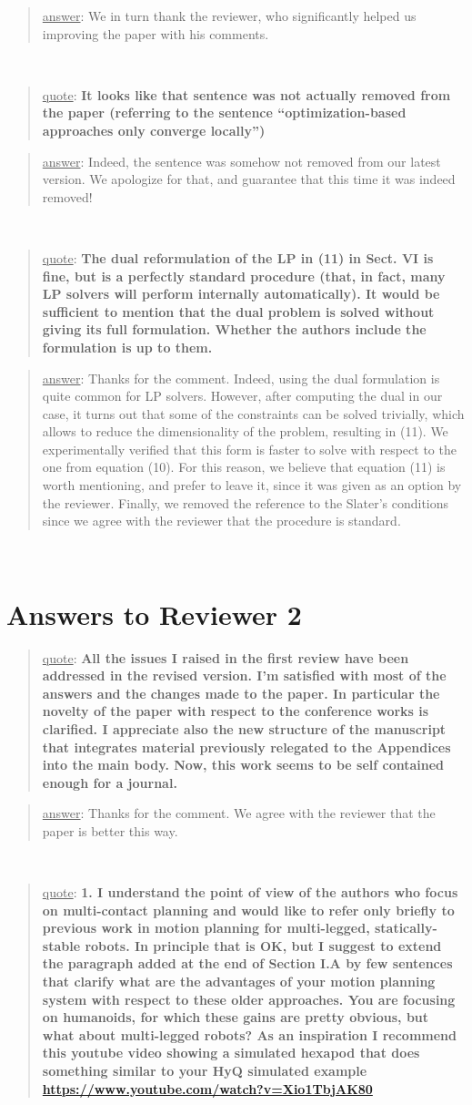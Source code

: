 \documentclass[a4paper]{article}
\newcommand\quot[1]{\begin{quote} \underline{quote}: \textbf{#1}\end{quote}}
\newcommand\as[1]{\begin{quote} \underline{answer}: {#1}\end{quote} }
\begin{document}
\as{We in turn thank the reviewer, who significantly helped us improving the paper with his comments.}

\leavevmode \\
\quot {It looks like that sentence was not actually removed from the
paper (referring to the sentence ``optimization-based approaches
only converge locally'')
}

\as{Indeed, the sentence was somehow not removed from our latest version. We apologize for that, and guarantee that this time it was indeed removed!}

\leavevmode \\
\quot {
The dual reformulation of the LP in (11) in Sect. VI is fine, but is
a perfectly standard procedure (that, in fact, many LP solvers will
perform internally automatically). It would be sufficient to mention
that the dual problem is solved without giving its full formulation.
Whether the authors include the formulation is up to them.}

\as{Thanks for the comment. Indeed, using the dual formulation is quite common for LP solvers. However, after computing the dual in our case, it turns out that some of the constraints can be solved trivially, which allows to reduce the dimensionality of the problem, resulting in (11). We experimentally verified that this form is faster to solve with respect to the one from equation (10). For this reason, we believe that equation (11) is worth mentioning, and prefer to leave it, since it was given as an option by the reviewer. Finally, we removed the reference to the Slater's conditions since we agree with the reviewer that the procedure is standard.}

\leavevmode \\
\section{Answers to Reviewer 2}
\quot{All the issues I raised in the first review have been addressed in
the revised version. I'm satisfied with most of the answers and the
changes made to the paper. In particular the novelty of the paper with
respect to the conference works is clarified. I appreciate also the new
structure of the manuscript that integrates material previously
relegated to the Appendices into the main body. Now, this work seems to
be self contained enough for a journal. }
\as{Thanks for the comment. We agree with the reviewer that the paper is better this way.}

\leavevmode \\
\quot{
1. I understand the point of view of the authors who focus on
multi-contact planning and would like to refer only briefly to previous
work in motion planning for multi-legged, statically-stable robots. In
principle that is OK, but I suggest to extend the paragraph added at
the end of Section I.A by few sentences that clarify what are the
advantages of your motion planning system with respect to these older
approaches. You are focusing on humanoids, for which these gains are
pretty obvious, but what about multi-legged robots? As an inspiration I
recommend this youtube video showing a simulated hexapod that does
something similar to your HyQ simulated example
\url{https://www.youtube.com/watch?v=Xio1TbjAK80}}
\end{document}
